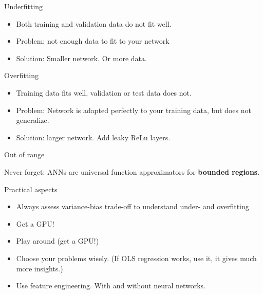 \documentclass[color=usenames,dvipsnames]{beamer}
\begin{document}
\begin{frame}{Underfitting}

\begin{itemize}
\item Both training and validation data do not fit well.
\item Problem: not enough data to fit to your network
\item Solution: Smaller network. Or more data.
\end{itemize}

\end{frame}




\begin{frame}{Overfitting}

\begin{itemize}
\item Training data fits well, validation or test data does not. 
\item Problem: Network is adapted perfectly to your training data, but does not generalize.
\item Solution: larger network. Add leaky ReLu layers. 
\end{itemize}

\end{frame}

\begin{frame}{Out of range}

Never forget: ANNs are universal function approximators for \textbf{bounded regions}.
\end{frame}



\begin{frame}{Practical aspects} 

\begin{itemize}
\item Always assess variance-bias trade-off to understand under- and overfitting
\item Get a GPU!
\item Play around (get a GPU!)
\item Choose your problems wisely. (If OLS regression works, use it, it gives much more insights.)
\item Use feature engineering. With and without neural networks.
\end{itemize}

\end{frame}
\end{document}
